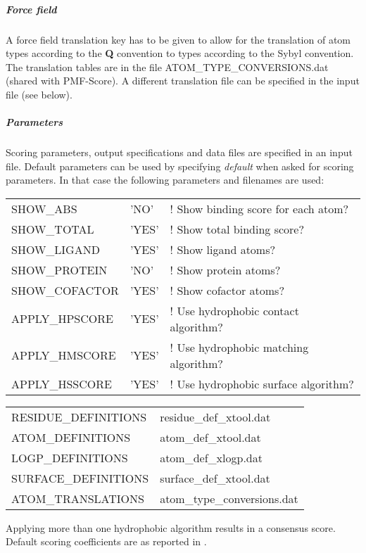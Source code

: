 \documentclass[a4paper,10pt]{article}
\begin{document}
\subparagraph{Force field}
A  force field  translation  key has  to  be given  to  allow for  the
translation  of atom  types according  to  the \textbf{Q}  convention to  types
according to the  Sybyl convention. The translation tables  are in the
file ATOM\_TYPE\_CONVERSIONS.dat (shared  with PMF-Score). A different
translation file can be specified in the input file (see below).

\subparagraph{Parameters}
Scoring parameters, output specifications and data files are specified
in  an  input file.  Default  parameters  can  be used  by  specifying
\emph{default} when  asked for  scoring parameters.  In that  case the
following parameters and filenames are used:

    \begin{tabular}{lll}
    SHOW\_ABS      & 'NO'  &          ! Show binding score for each atom? \\
    SHOW\_TOTAL    & 'YES' &          ! Show total binding score? \\
    SHOW\_LIGAND   & 'YES' &          ! Show ligand atoms? \\
    SHOW\_PROTEIN  & 'NO'  &          ! Show protein atoms? \\
    SHOW\_COFACTOR & 'YES' &          ! Show cofactor atoms? \\

    APPLY\_HPSCORE & 'YES' &          ! Use hydrophobic contact algorithm? \\
    APPLY\_HMSCORE & 'YES' &          ! Use hydrophobic matching algorithm? \\
    APPLY\_HSSCORE & 'YES' &          ! Use hydrophobic surface algorithm? \\
    \end{tabular}

    \begin{tabular}{ll}
    RESIDUE\_DEFINITIONS &   residue\_def\_xtool.dat      \\
    ATOM\_DEFINITIONS    &   atom\_def\_xtool.dat         \\
    LOGP\_DEFINITIONS    &   atom\_def\_xlogp.dat         \\
    SURFACE\_DEFINITIONS &   surface\_def\_xtool.dat      \\
    ATOM\_TRANSLATIONS   &   atom\_type\_conversions.dat  \\
    \end{tabular}

Applying more than one hydrophobic algorithm results in a consensus score. Default scoring coefficients are as reported in \cite{Wang:2002}.
\end{document}
